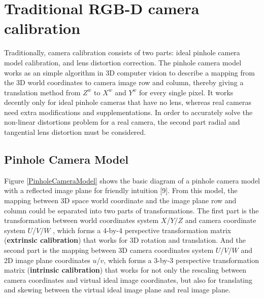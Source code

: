 \section{Traditional RGB-D camera calibration} %
\label{sens_TraditionalCalibration} %
Traditionally, camera calibration consists of two parts: ideal pinhole camera model calibration, and lens distortion correction. The pinhole camera model works as an simple algorithm in 3D computer vision to describe a mapping from the 3D world coordinates to camera image row and column, thereby giving a translation method from \(Z^{w}\) to \(X^{w}\)  and \(Y^{w}\)  for every single pixel. It works decently only for ideal pinhole cameras that have no lens, whereas real cameras need extra modifications and supplementations. In order to accurately solve the non-linear distortions problem for a real camera, the second part radial and tangential lens distortion must be considered.\\\par

\subsection{Pinhole Camera Model}
\label{sectionPinholeCamera}
Figure \ref{PinholeCameraModel} shows the basic diagram of a pinhole camera model with a reflected image plane for friendly intuition
[9].%
From this model, the mapping between 3D space world coordinate and the image plane row and column could be separated into two parts of transformations. The first part is the transformation between world coordinates system \(X\)/\(Y\)/\(Z\) and camera coordinate system \(U\)/\(V\)/\(W\) , which forms a 4-by-4 perspective transformation matrix (\textbf{extrinsic calibration}) that works for 3D rotation and translation. And the second part is the mapping between 3D camera coordinates system \(U\)/\(V\)/\(W\) and 2D image plane coordinates  \(u\)/\(v\), which forms a 3-by-3 perspective transformation matrix (\textbf{intrinsic calibration}) that works for not only the rescaling between camera coordinates and virtual ideal image coordinates, but also for translating and skewing between the virtual ideal image plane and real image plane.  \\\\\par

